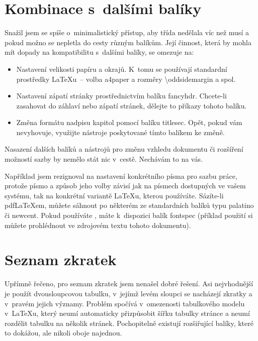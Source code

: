 \documentclass[FM,DP,EN]{tulthesis}
\newcommand{\argument}[1]{{\ttfamily\color{\tulcolor}#1}}
\newcommand{\prikazneindex}[1]{\argument{\textbackslash #1}}
\begin{document}
\section{Kombinace s~dalšími balíky}

Snažil jsem se spíše o~minimalistický přístup, aby třída nedělala víc než musí
a pokud možno se nepletla do cesty různým balíkům. Její činnost, která by
mohla mít dopady na kompatibilitu s~dalšími balíky, se omezuje na:

\begin{itemize}
\item Nastavení velikosti papíru a okrajů. K~tomu se používají standardní
prostředky \LaTeX u~-- volba \argument{a4paper} a rozměry
\prikazneindex{oddsidemargin} a spol.

\item Nastavení zápatí stránky prostřednictvím balíku \argument{fancyhdr}.
Chcete-li zasahovat do záhlaví nebo zápatí stránek, dělejte to příkazy tohoto
balíku.

\item Změna formátu nadpisu kapitol pomocí balíku \argument{titlesec}. Opět,
pokud vám nevyhovuje, využijte nástroje poskytované tímto balíkem ke změně.

\end{itemize}

Nasazení dalších balíků a nástrojů pro změnu vzhledu dokumentu či rozšíření
možností sazby by nemělo stát nic v~cestě. Nechávám to na vás.

Například jsem rezignoval na nastavení konkrétního písma pro sazbu práce,
protože písmo a způsob jeho volby závisí jak na písmech dostupných ve vašem
systému, tak na konkrétní variantě \LaTeX u, kterou používáte. Sázíte-li
pdf\-\LaTeX\-em, můžete sáhnout po některém ze standardních balíků typu
\argument{palatino} či \argument{newcent}. Pokud používáte \XeLaTeX, máte
k~dispozici balík \argument{fontspec} (příklad použití si můžete prohlédnout ve
zdrojovém textu tohoto dokumentu).


\section{Seznam zkratek}\label{zkratky}

Upřímně řečeno, pro seznam zkratek jsem nenašel dobré řešení. Asi nejvhodnější
je použít dvousloupcovou tabulku, v~jejímž levém sloupci se nacházejí zkratky a
v~pravém jejich významy. Problém spočívá v~omezenosti tabulkového modelu
v~\LaTeX u, který neumí automaticky přizpůsobit šířku tabulky stránce a neumí
rozdělit tabulku na několik stránek. Pochopitelně existují rozšiřující balíky,
které to dokážou, ale nikoli oboje najednou.
\end{document}
